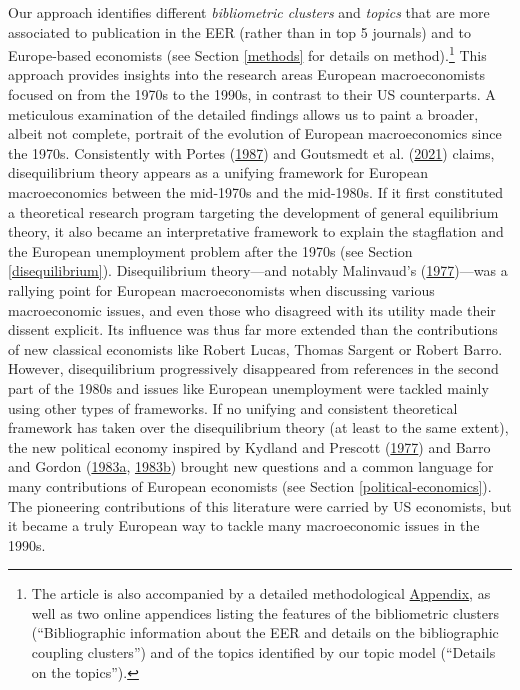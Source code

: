 \documentclass[
  12pt,
  onecolumn]{article}
\begin{document}
Our approach identifies different \emph{bibliometric clusters} and
\emph{topics} that are more associated to publication in the EER (rather
than in top 5 journals) and to Europe-based economists (see Section
\ref{methods} for details on method).\footnote{The article is also
  accompanied by a detailed methodological
  \protect\hyperlink{appendix}{Appendix}, as well as two online
  appendices listing the features of the bibliometric clusters
  (``Bibliographic information about the EER and details on the
  bibliographic coupling clusters'') and of the topics identified by our
  topic model (``Details on the topics'').} This approach provides
insights into the research areas European macroeconomists focused on
from the 1970s to the 1990s, in contrast to their US counterparts. A
meticulous examination of the detailed findings allows us to paint a
broader, albeit not complete, portrait of the evolution of European
macroeconomics since the 1970s. Consistently with Portes
(\protect\hyperlink{ref-portes1987}{1987}) and Goutsmedt et al.
(\protect\hyperlink{ref-goutsmedt2021}{2021}) claims, disequilibrium
theory appears as a unifying framework for European macroeconomics
between the mid-1970s and the mid-1980s. If it first constituted a
theoretical research program targeting the development of general
equilibrium theory, it also became an interpretative framework to
explain the stagflation and the European unemployment problem after the
1970s (see Section \ref{disequilibrium}). Disequilibrium theory---and
notably Malinvaud's (\protect\hyperlink{ref-malinvaud1977}{1977})---was
a rallying point for European macroeconomists when discussing various
macroeconomic issues, and even those who disagreed with its utility made
their dissent explicit. Its influence was thus far more extended than
the contributions of new classical economists like Robert Lucas, Thomas
Sargent or Robert Barro. However, disequilibrium progressively
disappeared from references in the second part of the 1980s and issues
like European unemployment were tackled mainly using other types of
frameworks. If no unifying and consistent theoretical framework has
taken over the disequilibrium theory (at least to the same extent), the
new political economy inspired by Kydland and Prescott
(\protect\hyperlink{ref-kydland1977}{1977}) and Barro and Gordon
(\protect\hyperlink{ref-barro1983}{1983a},
\protect\hyperlink{ref-barro1983c}{1983b}) brought new questions and a
common language for many contributions of European economists (see
Section \ref{political-economics}). The pioneering contributions of this
literature were carried by US economists, but it became a truly European
way to tackle many macroeconomic issues in the 1990s.
\end{document}
